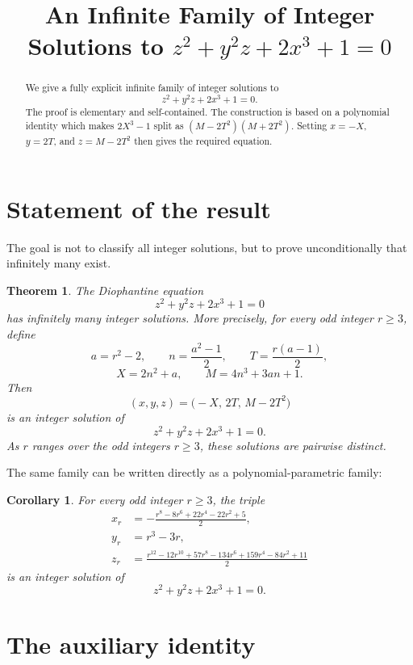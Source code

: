 \documentclass[11pt]{article}
\title{An Infinite Family of Integer Solutions to \texorpdfstring{\(z^2+y^2z+2x^3+1=0\)}{z^2+y^2z+2x^3+1=0}}
\author{}
\date{}
\newtheorem{theorem}{Theorem}
\newtheorem{corollary}{Corollary}
\theoremstyle{remark}
\begin{document}
\maketitle

\begin{abstract}
We give a fully explicit infinite family of integer solutions to
\[
        z^2+y^2z+2x^3+1=0.
\]
The proof is elementary and self-contained.  The construction is based on a polynomial identity which makes
\(2X^3-1\) split as
\((M-2T^2)(M+2T^2)\).  Setting \(x=-X\), \(y=2T\), and
\(z=M-2T^2\) then gives the required equation.
\end{abstract}

\section{Statement of the result}

The goal is not to classify all integer solutions, but to prove unconditionally that infinitely many exist.

\begin{theorem}\label{thm:main}
The Diophantine equation
\[
        z^2+y^2z+2x^3+1=0
\]
has infinitely many integer solutions.  More precisely, for every odd integer \(r\geq 3\), define
\[
        a=r^2-2,\qquad n=\frac{a^2-1}{2},\qquad T=\frac{r(a-1)}2,
\]
\[
        X=2n^2+a,
        \qquad
        M=4n^3+3an+1.
\]
Then
\[
        \boxed{(x,y,z)=\bigl(-X,\,2T,\,M-2T^2\bigr)}
\]
is an integer solution of
\[
        z^2+y^2z+2x^3+1=0.
\]
As \(r\) ranges over the odd integers \(r\geq 3\), these solutions are pairwise distinct.
\end{theorem}

The same family can be written directly as a polynomial-parametric family:
\begin{corollary}\label{cor:polynomial}
For every odd integer \(r\geq 3\), the triple
\[
\boxed{
\begin{aligned}
 x_r&=-\frac{r^8-8r^6+22r^4-22r^2+5}{2},\\
 y_r&=r^3-3r,\\
 z_r&=\frac{r^{12}-12r^{10}+57r^8-134r^6+159r^4-84r^2+11}{2}
\end{aligned}}
\]
is an integer solution of
\[
        z^2+y^2z+2x^3+1=0.
\]
\end{corollary}

\section{The auxiliary identity}
\end{document}
